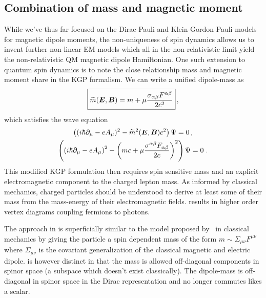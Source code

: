 \subsection{Combination of mass and magnetic moment}
\label{sec:ikgp}
While we've thus far focused on the Dirac-Pauli and Klein-Gordon-Pauli models for magnetic dipole moments, the non-uniqueness of spin dynamics allows us to invent further non-linear EM models which all in the non-relativistic limit yield the non-relativistic QM magnetic dipole Hamiltonian. One such extension to quantum spin dynamics is to note the close relationship mass and magnetic moment share in the KGP formalism. We can write a unified dipole-mass as
\begin{alignat}{1}
    \label{eq:ext:01} \boxed{\widetilde{m}(\boldsymbol{E},\boldsymbol{B}) = m +\mu\frac{\sigma_{\alpha\beta}F^{\alpha\beta}}{2c^{2}}}\,,
\end{alignat}
which satisfies the wave equation
\begin{gather}
\label{eq:ext:02} \left((i\hbar\partial_{\mu}-eA_{\mu})^{2}-\widetilde{m}^{2}(\boldsymbol{E},\boldsymbol{B})c^{2}\right)\Psi=0\,,\\
\label{IKGP01} \left(\left(i\hbar\partial_{\mu}-eA_{\mu}\right)^{2}-\left(mc+\mu\frac{\sigma^{\alpha\beta}F_{\alpha\beta}}{2c}\right)^{2}\right)\Psi=0\;.
\end{gather}
This modified KGP formulation then requires spin sensitive mass and an explicit electromagnetic component to the charged lepton mass. As informed by classical mechanics, charged particles should be understood to derive at least some of their mass from the mass-energy of their electromagnetic fields.  results in higher order vertex diagrams coupling fermions to photons.

The approach in  is superficially similar to the model proposed by~\cite{Frenkel:1926zz} in classical mechanics by giving the particle a spin dependent mass of the form $m\sim\Sigma_{\mu\nu}F^{\mu\nu}$ where $\Sigma_{\mu\nu}$ is the covariant generalization of the classical magnetic and electric dipole.  is however distinct in that the mass is allowed off-diagonal components in spinor space (a subspace which doesn't exist classically). The dipole-mass  is off-diagonal in spinor space in the Dirac representation and no longer commutes likes a scalar.


